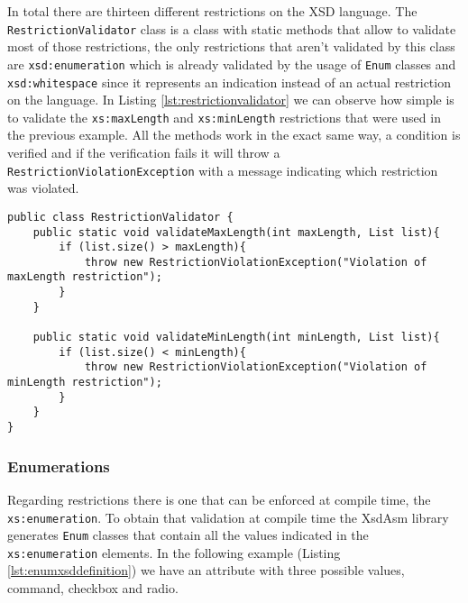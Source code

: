 \noindent
In total there are thirteen different restrictions on the \ac{XSD} language. The \texttt{RestrictionValidator} class is a class with static methods that allow to validate most of those restrictions, the only restrictions that aren't validated by this class are \texttt{xsd:enumeration} which is already validated by the usage of \texttt{Enum} classes and \texttt{xsd:whitespace} since it represents an indication instead of an actual restriction on the language. In Listing \ref{lst:restrictionvalidator} we can observe how simple is to validate the \texttt{xs:maxLength} and \texttt{xs:minLength} restrictions that were used in the previous example. All the methods work in the exact same way, a condition is verified and if the verification fails it will throw a \texttt{RestrictionViolationException} with a message indicating which restriction was violated.

\bigskip


\begin{minipage}{\linewidth}
\begin{lstlisting}[caption={RestrictionValidator Class (Simplified)},label={lst:restrictionvalidator}]
public class RestrictionValidator {
    public static void validateMaxLength(int maxLength, List list){
        if (list.size() > maxLength){
            throw new RestrictionViolationException("Violation of maxLength restriction");
        }
    }
    
    public static void validateMinLength(int minLength, List list){
        if (list.size() < minLength){
            throw new RestrictionViolationException("Violation of minLength restriction");
        }
    }
}
\end{lstlisting}
\end{minipage}

\subsubsection{Enumerations}
\label{sec:enumarations}

Regarding restrictions there is one that can be enforced at compile time, the \texttt{xs:enumeration}. To obtain that validation at compile time the XsdAsm library generates \texttt{Enum} classes that contain all the values indicated in the \texttt{xs:enumeration} elements. In the following example (Listing \ref{lst:enumxsddefinition}) we have an attribute with three possible values, command, checkbox and radio.

